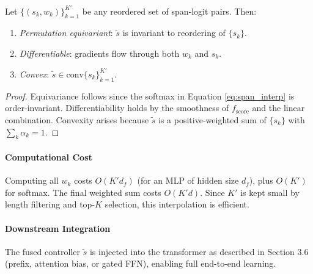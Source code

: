 \begin{proposition}
	Let \(\{(s_k,w_k)\}_{k=1}^{K'}\) be any reordered set of span‐logit pairs.  Then:
	\begin{enumerate}
		\item \emph{Permutation equivariant}: \(\tilde s\) is invariant to reordering of \(\{s_k\}\).  
		\item \emph{Differentiable}: gradients flow through both \(w_k\) and \(s_k\).  
		\item \emph{Convex}: \(\tilde s\in\mathrm{conv}\{s_k\}_{k=1}^{K'}\).  
	\end{enumerate}
\end{proposition}
\begin{proof}
	Equivariance follows since the softmax in Equation \ref{eq:span_interp} is order‐invariant.  Differentiability holds by the smoothness of \(f_{\mathrm{score}}\) and the linear combination.  Convexity arises because \(\tilde s\) is a positive‐weighted sum of \(\{s_k\}\) with \(\sum_k\alpha_k=1\).
\end{proof}

\paragraph{Computational Cost}  
Computing all \(w_k\) costs \(O(K'd_f)\) (for an MLP of hidden size \(d_f\)), plus \(O(K')\) for softmax.  The final weighted sum costs \(O(K'd)\).  Since \(K'\) is kept small by length filtering and top-\(K\) selection, this interpolation is efficient.

\paragraph{Downstream Integration}  
The fused controller \(\tilde s\) is injected into the transformer as described in Section 3.6 (prefix, attention bias, or gated FFN), enabling full end-to-end learning.